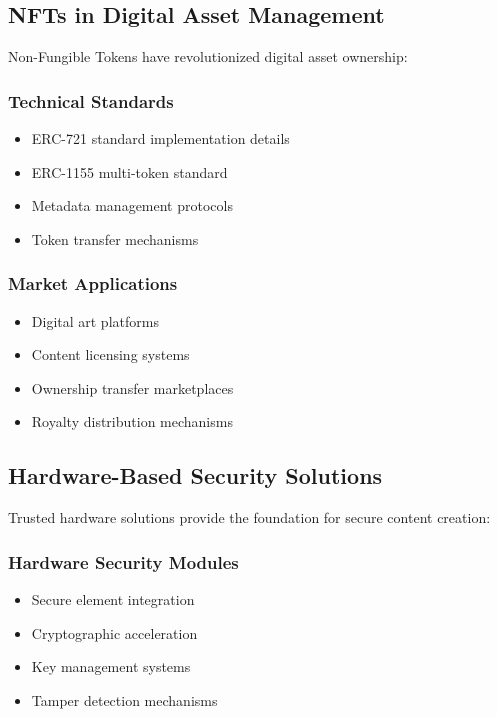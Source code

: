 \documentclass[conference]{IEEEtran}
\begin{document}
\subsection{NFTs in Digital Asset Management}
Non-Fungible Tokens have revolutionized digital asset ownership:

\subsubsection{Technical Standards}
\begin{itemize}
    \item ERC-721 standard implementation details
    \item ERC-1155 multi-token standard
    \item Metadata management protocols
    \item Token transfer mechanisms
\end{itemize}

\subsubsection{Market Applications}
\begin{itemize}
    \item Digital art platforms
    \item Content licensing systems
    \item Ownership transfer marketplaces
    \item Royalty distribution mechanisms
\end{itemize}

\subsection{Hardware-Based Security Solutions}
Trusted hardware solutions provide the foundation for secure content creation:

\subsubsection{Hardware Security Modules}
\begin{itemize}
    \item Secure element integration
    \item Cryptographic acceleration
    \item Key management systems
    \item Tamper detection mechanisms
\end{itemize}
\end{document}
